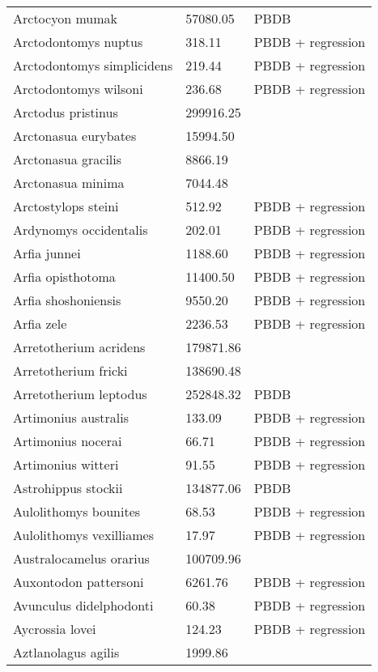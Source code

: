 \begin{center}
\begin{longtable}{p{} p{} p{} }
  Arctocyon mumak & 57080.05 & PBDB \\ 
  Arctodontomys nuptus & 318.11 & PBDB + regression \\ 
  Arctodontomys simplicidens & 219.44 & PBDB + regression \\ 
  Arctodontomys wilsoni & 236.68 & PBDB + regression \\ 
  Arctodus pristinus & 299916.25 & \cite{Smith2004} \\ 
  Arctonasua eurybates & 15994.50 & \cite{Tomiya2013} \\ 
  Arctonasua gracilis & 8866.19 & \cite{Tomiya2013} \\ 
  Arctonasua minima & 7044.48 & \cite{Tomiya2013} \\ 
  Arctostylops steini & 512.92 & PBDB + regression \\ 
  Ardynomys occidentalis & 202.01 & PBDB + regression \\ 
  Arfia junnei & 1188.60 & PBDB + regression \\ 
  Arfia opisthotoma & 11400.50 & PBDB + regression \\ 
  Arfia shoshoniensis & 9550.20 & PBDB + regression \\ 
  Arfia zele & 2236.53 & PBDB + regression \\ 
  Arretotherium acridens & 179871.86 & \cite{Tomiya2013} \\ 
  Arretotherium fricki & 138690.48 & \cite{Tomiya2013} \\ 
  Arretotherium leptodus & 252848.32 & PBDB \\ 
  Artimonius australis & 133.09 & PBDB + regression \\ 
  Artimonius nocerai & 66.71 & PBDB + regression \\ 
  Artimonius witteri & 91.55 & PBDB + regression \\ 
  Astrohippus stockii & 134877.06 & PBDB \\ 
  Aulolithomys bounites & 68.53 & PBDB + regression \\ 
  Aulolithomys vexilliames & 17.97 & PBDB + regression \\ 
  Australocamelus orarius & 100709.96 & \cite{Tomiya2013} \\ 
  Auxontodon pattersoni & 6261.76 & PBDB + regression \\ 
  Avunculus didelphodonti & 60.38 & PBDB + regression \\ 
  Aycrossia lovei & 124.23 & PBDB + regression \\ 
  Aztlanolagus agilis & 1999.86 & \cite{Smith2004} \\ 

\end{longtable}
\end{center}
